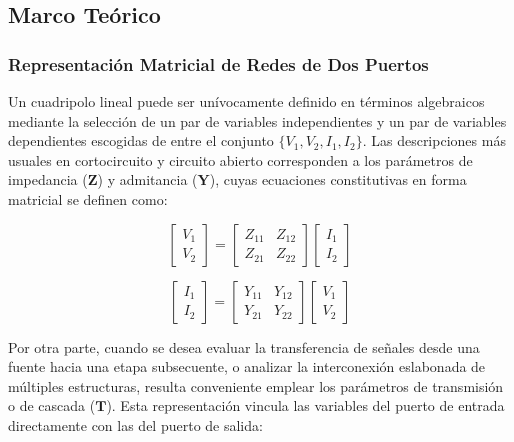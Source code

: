 \subsection{Marco Teórico}

\subsubsection{Representación Matricial de Redes de Dos Puertos}
Un cuadripolo lineal puede ser unívocamente definido en términos algebraicos mediante la selección de un par de variables independientes y un par de variables dependientes escogidas de entre el conjunto $\{V_1, V_2, I_1, I_2\}$. Las descripciones más usuales en cortocircuito y circuito abierto corresponden a los parámetros de impedancia ($\mathbf{Z}$) y admitancia ($\mathbf{Y}$), cuyas ecuaciones constitutivas en forma matricial se definen como:

\begin{equation}
    \begin{bmatrix} V_1 \\ V_2 \end{bmatrix} 
    = 
    \begin{bmatrix} Z_{11} & Z_{12} \\ Z_{21} & Z_{22} \end{bmatrix} 
    \begin{bmatrix} I_1 \\ I_2 \end{bmatrix}
\end{equation}

\begin{equation}
    \begin{bmatrix} I_1 \\ I_2 \end{bmatrix} 
    = 
    \begin{bmatrix} Y_{11} & Y_{12} \\ Y_{21} & Y_{22} \end{bmatrix} 
    \begin{bmatrix} V_1 \\ V_2 \end{bmatrix}
\end{equation}

Por otra parte, cuando se desea evaluar la transferencia de señales desde una fuente hacia una etapa subsecuente, o analizar la interconexión eslabonada de múltiples estructuras, resulta conveniente emplear los parámetros de transmisión o de cascada ($\mathbf{T}$). Esta representación vincula las variables del puerto de entrada directamente con las del puerto de salida:

